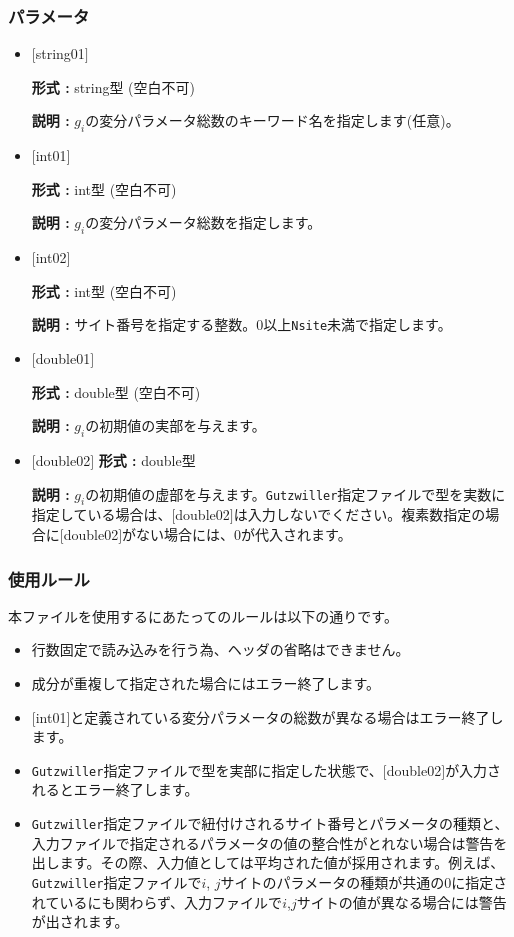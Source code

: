 \subsubsection{パラメータ}
 \begin{itemize}

   \item  $[$string01$]$
   
    {\bf 形式 :} string型 (空白不可)

   {\bf 説明 :} $g_i$の変分パラメータ総数のキーワード名を指定します(任意)。

   \item  $[$int01$]$
   
    {\bf 形式 :} int型 (空白不可)

   {\bf 説明 :} $g_i$の変分パラメータ総数を指定します。

  \item  $[$int02$]$
  
 {\bf 形式 :} int型 (空白不可)

{\bf 説明 :} サイト番号を指定する整数。0以上\verb|Nsite|{未満}で指定します。
 
 \item  $[$double01$]$
   
   {\bf 形式 :} double型 (空白不可)

  {\bf 説明 :} $g_i$の初期値の実部を与えます。
   
   \item  $[$double02$]$
   {\bf 形式 :} double型 

  {\bf 説明 :} $g_i$の初期値の虚部を与えます。\verb|Gutzwiller|指定ファイルで型を実数に指定している場合は、$[$double02$]$は入力しないでください。複素数指定の場合に$[$double02$]$がない場合には、0が代入されます。
   
\end{itemize}

\subsubsection{使用ルール}
本ファイルを使用するにあたってのルールは以下の通りです。
\begin{itemize}
\item 行数固定で読み込みを行う為、ヘッダの省略はできません。
\item 成分が重複して指定された場合にはエラー終了します。
\item $[$int01$]$と定義されている変分パラメータの総数が異なる場合はエラー終了します。
\item \verb|Gutzwiller|指定ファイルで型を実部に指定した状態で、$[$double02$]$が入力されるとエラー終了します。
\item \verb|Gutzwiller|指定ファイルで紐付けされるサイト番号とパラメータの種類と、入力ファイルで指定されるパラメータの値の整合性がとれない場合は警告を出します。その際、入力値としては平均された値が採用されます。例えば、\verb|Gutzwiller|指定ファイルで$i$, $j$サイトのパラメータの種類が共通の$0$に指定されているにも関わらず、入力ファイルで$i$,$j$サイトの値が異なる場合には警告が出されます。
\end{itemize}


